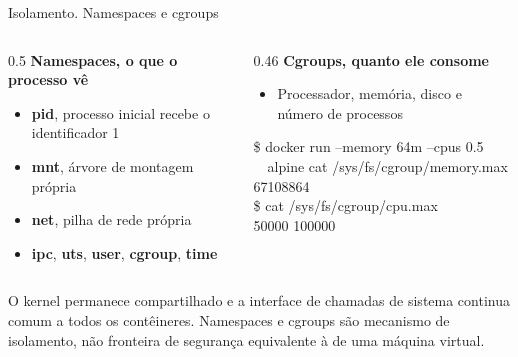 \documentclass[aspectratio=169]{beamer}
\begin{document}
\begin{frame}{Isolamento. Namespaces e cgroups}
  \begin{columns}[T]
    \begin{column}{0.5\textwidth}
      \textbf{Namespaces, o que o processo vê}
      \begin{itemize}
        \item \textbf{pid}, processo inicial recebe o identificador 1
        \item \textbf{mnt}, árvore de montagem própria
        \item \textbf{net}, pilha de rede própria
        \item \textbf{ipc}, \textbf{uts}, \textbf{user}, \textbf{cgroup}, \textbf{time}
      \end{itemize}
    \end{column}
    \begin{column}{0.46\textwidth}
      \textbf{Cgroups, quanto ele consome}
      \begin{itemize}
        \item Processador, memória, disco e número de processos
      \end{itemize}
      \begin{tcolorbox}[colback=black!88, coltext=white, colframe=black, arc=2mm, fontupper=\tiny\ttfamily]
        \$ docker run --memory 64m --cpus 0.5 \\
        \ \ alpine cat /sys/fs/cgroup/memory.max \\[2pt]
        67108864 \\
        \$ cat /sys/fs/cgroup/cpu.max \\[2pt]
        50000 100000
      \end{tcolorbox}
    \end{column}
  \end{columns}
  \vspace{0.25cm}
  \begin{tcolorbox}[colback=red!8, colframe=red!55, arc=2mm, fontupper=\footnotesize]
    O kernel permanece compartilhado e a interface de chamadas de sistema continua comum a todos os contêineres. Namespaces e cgroups são mecanismo de isolamento, não fronteira de segurança equivalente à de uma máquina virtual.
  \end{tcolorbox}
\end{frame}
\end{document}
